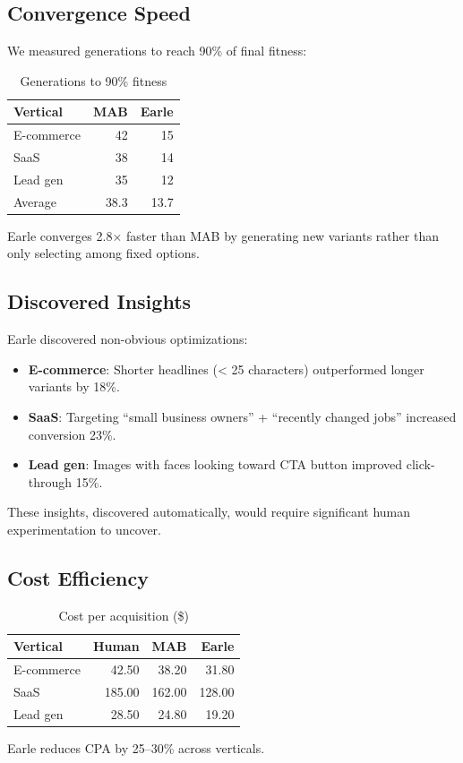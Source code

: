 \subsection{Convergence Speed}

We measured generations to reach 90\% of final fitness:

\begin{table}[h]
\centering
\caption{Generations to 90\% fitness}
\label{tab:convergence}
\begin{tabular}{lrr}
\hline
Vertical & MAB & Earle \\
\hline
E-commerce & 42 & 15 \\
SaaS & 38 & 14 \\
Lead gen & 35 & 12 \\
\hline
Average & 38.3 & 13.7 \\
\hline
\end{tabular}
\end{table}

Earle converges 2.8$\times$ faster than MAB by generating new variants rather than only selecting among fixed options.

\subsection{Discovered Insights}

Earle discovered non-obvious optimizations:

\begin{itemize}
\item \textbf{E-commerce}: Shorter headlines (< 25 characters) outperformed longer variants by 18\%.
\item \textbf{SaaS}: Targeting ``small business owners'' + ``recently changed jobs'' increased conversion 23\%.
\item \textbf{Lead gen}: Images with faces looking toward CTA button improved click-through 15\%.
\end{itemize}

These insights, discovered automatically, would require significant human experimentation to uncover.

\subsection{Cost Efficiency}

\begin{table}[h]
\centering
\caption{Cost per acquisition (\$)}
\label{tab:cpa}
\begin{tabular}{lrrr}
\hline
Vertical & Human & MAB & Earle \\
\hline
E-commerce & 42.50 & 38.20 & 31.80 \\
SaaS & 185.00 & 162.00 & 128.00 \\
Lead gen & 28.50 & 24.80 & 19.20 \\
\hline
\end{tabular}
\end{table}

Earle reduces CPA by 25--30\% across verticals.

